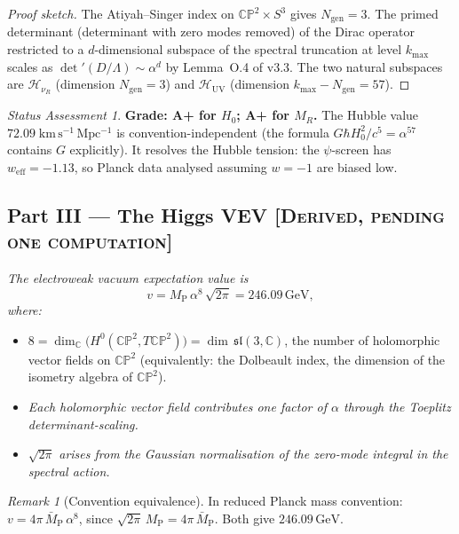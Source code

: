 \documentclass[11pt]{article}
\theoremstyle{definition}
\theoremstyle{remark}
\newtheorem*{remark}{Remark}
\newtheorem*{status}{Status Assessment}
\newcommand{\CP}{\mathbb{CP}}
\newcommand{\MP}{M_{\mathrm{P}}}
\newcommand{\MPbar}{\bar{M}_{\mathrm{P}}}
\newcommand{\GeV}{\,\mathrm{GeV}}
\begin{document}
\begin{proof}[Proof sketch]
The Atiyah--Singer index on $\CP^2 \times S^3$ gives
$N_{\mathrm{gen}} = 3$.  The primed determinant (determinant with
zero modes removed) of the Dirac operator restricted to a
$d$-dimensional subspace of the spectral truncation at level
$k_{\max}$ scales as $\det'(D/\Lambda) \sim \alpha^{d}$ by
Lemma~O.4 of v3.3.  The two natural subspaces are
$\mathcal{H}_{\nu_R}$ (dimension $N_{\mathrm{gen}} = 3$) and
$\mathcal{H}_{\mathrm{UV}}$ (dimension $k_{\max} - N_{\mathrm{gen}} = 57$).
\end{proof}

\begin{status}
\textbf{Grade: A+ for $H_0$; A+ for $M_R$.}  The Hubble value
$72.09\;\mathrm{km\,s^{-1}\,Mpc^{-1}}$ is convention-independent
(the formula $G\hbar H_0^2/c^5 = \alpha^{57}$ contains $G$ explicitly).
It resolves the Hubble tension: the $\psi$-screen has
$w_{\mathrm{eff}} = -1.13$, so Planck data analysed assuming
$w = -1$ are biased low.
\end{status}


\subsection*{Part III --- The Higgs VEV%
\hfill\normalfont\textsc{[Derived, pending one computation]}}

\textit{The electroweak vacuum expectation value is}
\begin{equation}\label{eq:higgs}
  v = \MP\,\alpha^{8}\,\sqrt{2\pi} = 246.09\GeV,
\end{equation}
\textit{where:}
\begin{itemize}
\item $8 = \dim_{\mathbb{C}}\bigl(H^0(\CP^2, T\CP^2)\bigr)
  = \dim\,\mathfrak{sl}(3,\mathbb{C})$, the number of holomorphic
  vector fields on $\CP^2$ (equivalently: the Dolbeault index, the
  dimension of the isometry algebra of $\CP^2$).
\item \textit{Each holomorphic vector field contributes one factor of
  $\alpha$ through the Toeplitz determinant-scaling.}
\item $\sqrt{2\pi}$ \textit{arises from the Gaussian normalisation of
  the zero-mode integral in the spectral action.}
\end{itemize}

\begin{remark}[Convention equivalence]
In reduced Planck mass convention: $v = 4\pi\,\MPbar\,\alpha^{8}$,
since $\sqrt{2\pi}\,\MP = 4\pi\,\MPbar$.  Both give $246.09\GeV$.
\end{remark}
\end{document}
